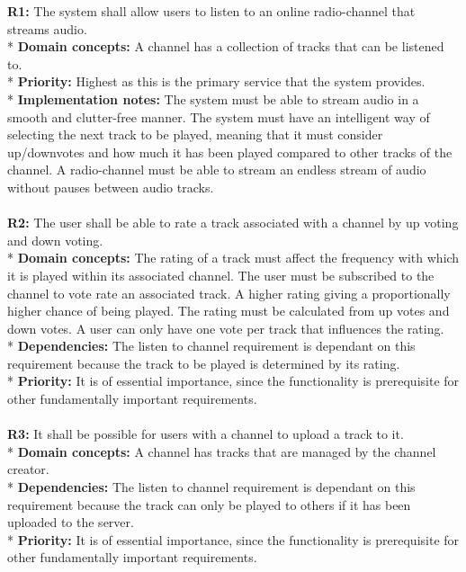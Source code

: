 \documentclass[a4paper,11pt,report]{article}
\begin{document}
{\textbf{R1:}
The system shall allow users to listen to an online radio-channel that streams audio. \\*
\textbf{Domain concepts:}
A channel has a collection of tracks that can be listened to. \\*
\textbf{Priority:}
Highest as this is the primary service that the system provides. \\*
\textbf{Implementation notes:}
The system must be able to stream audio in a smooth and clutter-free manner. The system must have an intelligent way of selecting the next track to be played, meaning that it must consider up/downvotes and how much it has been played compared to other tracks of the channel.
A radio-channel must be able to stream an endless stream of audio without pauses between audio tracks.
\\ \\

\textbf{R2:}
The user shall be able to rate a track associated with a channel by up voting and down voting. \\*
\textbf{Domain concepts:}
The rating of a track must affect the frequency with which it is played within its associated channel. The user must be subscribed to the channel to vote rate an associated track.
A higher rating giving a proportionally higher chance of being played. The rating must be calculated from up votes and down votes. A user can only have one vote per track that influences the rating. \\*
\textbf{Dependencies:}
The listen to channel requirement is dependant on this requirement because the track to be played is determined by its rating.\\*
\textbf{Priority:}
It is of essential importance, since the functionality is prerequisite for other fundamentally important requirements.
\\ \\

\textbf{R3:}
It shall be possible for users with a channel to upload a track to it. \\*
\textbf{Domain concepts:}
A channel has tracks that are managed by the channel creator. \\*
\textbf{Dependencies:}
The listen to channel requirement is dependant on this requirement because the track can only be played to others if it has been uploaded to the server.\\*
\textbf{Priority:}
It is of essential importance, since the functionality is prerequisite for other fundamentally important requirements.
\\ \\

}
\end{document}
